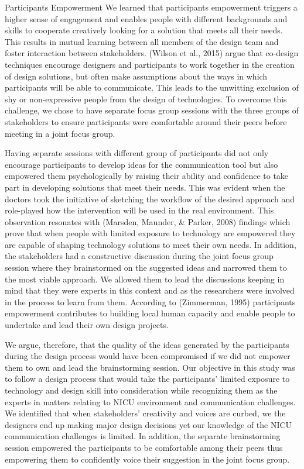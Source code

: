 Participants Empowerment
We learned that participants empowerment triggers a higher sense of engagement and enables people with different backgrounds and skills to cooperate creatively looking for a solution that meets all their needs. This results in mutual learning between all members of the design team and foster interaction between stakeholders. (Wilson et al., 2015) argue that co-design techniques encourage designers and participants to work together in the creation of design solutions, but often make assumptions about the ways in which participants will be able to communicate. This leads to the unwitting exclusion of shy or non-expressive people from the design of technologies. To overcome this challenge, we chose to have separate focus group sessions with the three groups of stakeholders to ensure participants were comfortable around their peers before meeting in a joint focus group.

Having separate sessions with different group of participants did not only encourage participants to develop ideas for the communication tool but also empowered them psychologically by raising their ability and confidence to take part in developing solutions that meet their needs. This was evident when the doctors took the initiative of sketching the workflow of the desired approach and role-played how the intervention will be used in the real environment. This observation resonates with (Marsden, Maunder, & Parker, 2008) findings which prove that when people with limited exposure to technology are empowered they are capable of shaping technology solutions to meet their own needs. In addition, the stakeholders had a constructive discussion during the joint focus group session where they brainstormed on the suggested ideas and narrowed them to the most viable approach. We allowed them to lead the discussions keeping in mind that they were experts in this context and as the researchers were involved in the process to learn from them. According to (Zimmerman, 1995) participants empowerment contributes to building local human capacity and enable people to undertake and lead their own design projects.

We argue, therefore, that the quality of the ideas generated by the participants during the design process would have been compromised if we did not empower them to own and lead the brainstorming session. Our objective in this study was to follow a design process that would take the participants’ limited exposure to technology and design skill into consideration while recognizing them as the experts in matters relating to NICU environment and communication challenges. We identified that when stakeholders’ creativity and voices are curbed, we the designers end up making major design decisions yet our knowledge of the NICU communication challenges is limited. In addition, the separate brainstorming session empowered the participants to be comfortable among their peers thus empowering them to confidently voice their suggestion in the joint focus group.  

